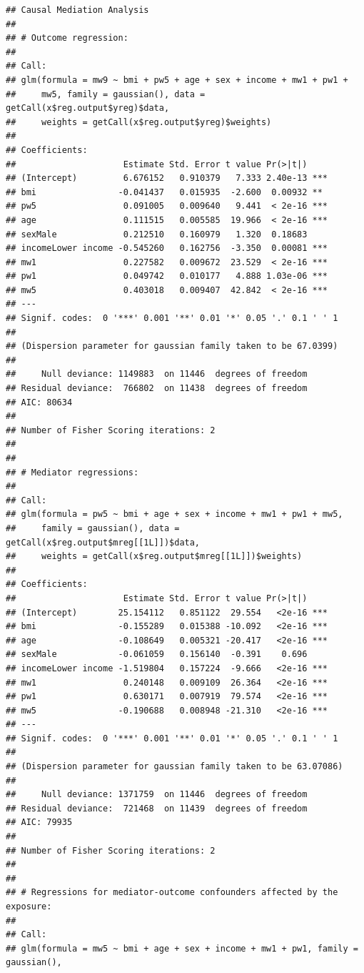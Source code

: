 \documentclass[
]{book}
\begin{document}
\begin{verbatim}
## Causal Mediation Analysis
## 
## # Outcome regression:
## 
## Call:
## glm(formula = mw9 ~ bmi + pw5 + age + sex + income + mw1 + pw1 + 
##     mw5, family = gaussian(), data = getCall(x$reg.output$yreg)$data, 
##     weights = getCall(x$reg.output$yreg)$weights)
## 
## Coefficients:
##                     Estimate Std. Error t value Pr(>|t|)    
## (Intercept)         6.676152   0.910379   7.333 2.40e-13 ***
## bmi                -0.041437   0.015935  -2.600  0.00932 ** 
## pw5                 0.091005   0.009640   9.441  < 2e-16 ***
## age                 0.111515   0.005585  19.966  < 2e-16 ***
## sexMale             0.212510   0.160979   1.320  0.18683    
## incomeLower income -0.545260   0.162756  -3.350  0.00081 ***
## mw1                 0.227582   0.009672  23.529  < 2e-16 ***
## pw1                 0.049742   0.010177   4.888 1.03e-06 ***
## mw5                 0.403018   0.009407  42.842  < 2e-16 ***
## ---
## Signif. codes:  0 '***' 0.001 '**' 0.01 '*' 0.05 '.' 0.1 ' ' 1
## 
## (Dispersion parameter for gaussian family taken to be 67.0399)
## 
##     Null deviance: 1149883  on 11446  degrees of freedom
## Residual deviance:  766802  on 11438  degrees of freedom
## AIC: 80634
## 
## Number of Fisher Scoring iterations: 2
## 
## 
## # Mediator regressions: 
## 
## Call:
## glm(formula = pw5 ~ bmi + age + sex + income + mw1 + pw1 + mw5, 
##     family = gaussian(), data = getCall(x$reg.output$mreg[[1L]])$data, 
##     weights = getCall(x$reg.output$mreg[[1L]])$weights)
## 
## Coefficients:
##                     Estimate Std. Error t value Pr(>|t|)    
## (Intercept)        25.154112   0.851122  29.554   <2e-16 ***
## bmi                -0.155289   0.015388 -10.092   <2e-16 ***
## age                -0.108649   0.005321 -20.417   <2e-16 ***
## sexMale            -0.061059   0.156140  -0.391    0.696    
## incomeLower income -1.519804   0.157224  -9.666   <2e-16 ***
## mw1                 0.240148   0.009109  26.364   <2e-16 ***
## pw1                 0.630171   0.007919  79.574   <2e-16 ***
## mw5                -0.190688   0.008948 -21.310   <2e-16 ***
## ---
## Signif. codes:  0 '***' 0.001 '**' 0.01 '*' 0.05 '.' 0.1 ' ' 1
## 
## (Dispersion parameter for gaussian family taken to be 63.07086)
## 
##     Null deviance: 1371759  on 11446  degrees of freedom
## Residual deviance:  721468  on 11439  degrees of freedom
## AIC: 79935
## 
## Number of Fisher Scoring iterations: 2
## 
## 
## # Regressions for mediator-outcome confounders affected by the exposure: 
## 
## Call:
## glm(formula = mw5 ~ bmi + age + sex + income + mw1 + pw1, family = gaussian(), 

\end{verbatim}
\end{document}
